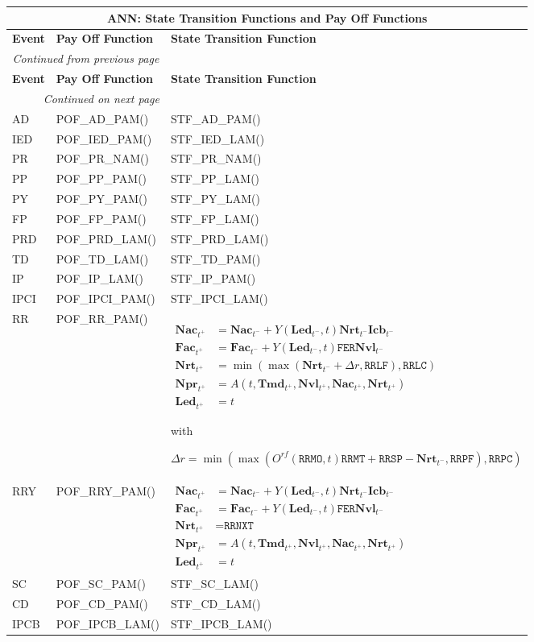 \documentclass[9pt,oneside]{amsart}
\newenvironment{functions}[1]{
    	\begin{longtable}[H]{| p{0.05\textwidth} | p{0.42\textwidth} |  p{0.48\textwidth} |}
	\multicolumn{3}{c}{\textbf{#1: State Transition Functions and Pay Off Functions}}\\
	\hline
	\textbf{Event} & \textbf{Pay Off Function} & \textbf{State Transition Function}\\
	\hline
	\endfirsthead
	\multicolumn{2}{c}{\textit{Continued from previous page}} \\
	\hline
	\textbf{Event} & \textbf{Pay Off Function} & \textbf{State Transition Function}\\
	\hline
	\endhead
	\hline \multicolumn{2}{r}{\textit{Continued on next page}} \\
	\endfoot
	\hline
	\endlastfoot
}{%
	\hline
    	\end{longtable}
}
\newcommand{\svar}[2]{\textbf{#1}_{#2}}
\newcommand{\attr}[1]{\texttt{#1}}
\newcommand{\stf}[2]{STF\_#1\_#2()}
\newcommand{\pof}[2]{POF\_#1\_#2()}
\newcommand{\yfr}[2]{Y(#1,#2)}
\newcommand{\ann}[5]{A(#1,#2,#3,#4,#5)}
\newcommand{\obs}[3]{O^{#1}(#2,#3)}
\begin{document}





\begin{functions}{ANN}
	AD & \pof{AD}{PAM} & \stf{AD}{PAM} \\
	\hline
	IED & \pof{IED}{PAM} & \stf{IED}{LAM} \\ 
	\hline
	PR & \pof{PR}{NAM} & \stf{PR}{NAM} \\
	\hline
	PP & \pof{PP}{PAM}
		& \stf{PP}{LAM} \\
	\hline
	PY & \pof{PY}{PAM}
		& \stf{PY}{LAM} \\
	\hline
	FP & \pof{FP}{PAM}
		& \stf{FP}{LAM} \\
	\hline 
  	PRD & \pof{PRD}{LAM}
		& \stf{PRD}{LAM} \\
	\hline
  	TD & \pof{TD}{LAM}
		& \stf{TD}{PAM} \\
	\hline
	IP & \pof{IP}{LAM}
		& \stf{IP}{PAM} \\
	\hline
	IPCI & \pof{IPCI}{PAM}
		& \stf{IPCI}{LAM} \\
	\hline
	RR & \pof{RR}{PAM}
		& {$\begin{aligned} 
			\svar{Nac}{t^+} &= \svar{Nac}{t^-} + \yfr{\svar{Led}{t^-}}{t}\svar{Nrt}{t^-}\svar{Icb}{t^-} \\
			\svar{Fac}{t^+} &= \svar{Fac}{t^-} + \yfr{\svar{Led}{t^-}}{t}\attr{FER}\svar{Nvl}{t^-} \\
			\svar{Nrt}{t^+} &= \min(\max(\svar{Nrt}{t^-}+\Delta r,\attr{RRLF}),\attr{RRLC}) \\
			\svar{Npr}{t^+} &= \ann{t}{\svar{Tmd}{t^+}}{\svar{Nvl}{t^+}}{\svar{Nac}{t^+}}{\svar{Nrt}{t^+}} \\
			\svar{Led}{t^+} &= t \end{aligned}$}\par
		with\par
		$\Delta r = \min(\max(\obs{rf}{\attr{RRMO}}{t}\attr{RRMT}+\attr{RRSP} - \svar{Nrt}{t^-},\attr{RRPF}),\attr{RRPC})$ \\
	\hline
	RRY & \pof{RRY}{PAM} 
		& {$\begin{aligned} 
			\svar{Nac}{t^+} &= \svar{Nac}{t^-} + \yfr{\svar{Led}{t^-}}{t}\svar{Nrt}{t^-}\svar{Icb}{t^-} \\
			\svar{Fac}{t^+} &= \svar{Fac}{t^-} + \yfr{\svar{Led}{t^-}}{t}\attr{FER}\svar{Nvl}{t^-} \\
			\svar{Nrt}{t^+} &= \attr{RRNXT} \\
			\svar{Npr}{t^+} &= \ann{t}{\svar{Tmd}{t^+}}{\svar{Nvl}{t^+}}{\svar{Nac}{t^+}}{\svar{Nrt}{t^+}} \\
			\svar{Led}{t^+} &= t \end{aligned}$} \\
	\hline
	SC & \pof{SC}{PAM}
		& \stf{SC}{LAM} \\
	\hline 
	CD & \pof{CD}{PAM}
		& \stf{CD}{LAM} \\
	\hline
	IPCB & \pof{IPCB}{LAM}
		& \stf{IPCB}{LAM} \\
\end{functions}
\end{document}
